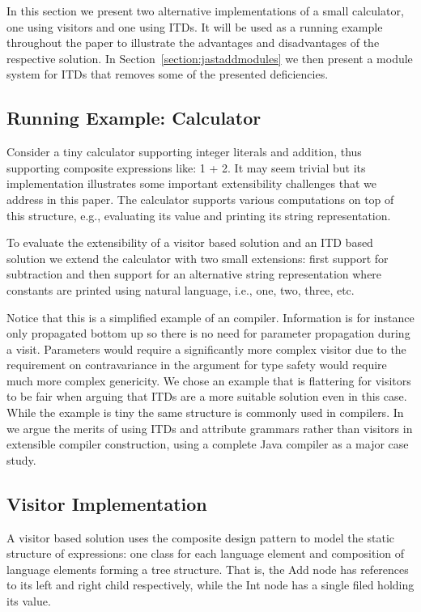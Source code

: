 In this section we present two alternative implementations of a small
calculator, one using visitors and one using ITDs. It will be used as a
running example throughout the paper to illustrate the advantages and
disadvantages of the respective solution. In Section~\ref{section:jastaddmodules}
we then present a module system for ITDs that removes some of the presented
deficiencies.

\subsection{Running Example: Calculator}
Consider a tiny calculator supporting integer literals and addition, thus 
supporting composite expressions like: 1 + 2. It may seem trivial but its 
implementation illustrates some important extensibility challenges that we 
address in this paper. The calculator supports various computations on top 
of this structure, e.g., evaluating its value and printing its string
representation.

To evaluate the extensibility of a visitor based solution and an ITD based
solution we extend the calculator with two small extensions: first support
for subtraction and then support for an alternative string representation 
where constants are printed using natural language, i.e., one, two, 
three, etc.


Notice that this is a simplified example of an compiler. Information is
for instance only propagated bottom up so there is no need for parameter
propagation during a visit. Parameters would require a significantly more 
complex visitor due to the requirement on contravariance in the argument 
for type safety would require much more complex genericity. We chose an 
example that is flattering for visitors to be fair when arguing that ITDs 
are a more suitable solution even in this case. While the example is 
tiny the same structure is commonly used in compilers. In~\cite{aosd08abc} we argue 
the merits of using ITDs and attribute grammars rather than visitors in 
extensible compiler construction, using a complete Java compiler as a 
major case study.

\subsection{Visitor Implementation}
A visitor based solution uses the composite design pattern to model the
static structure of expressions: one class for each language element and
composition of language elements forming a tree structure. That is, the 
Add node has references to its left and right child respectively, while 
the Int node has a single filed holding its value.

